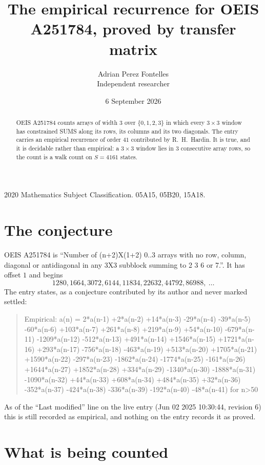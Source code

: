 \documentclass[11pt,a4paper]{article}
\title{The empirical recurrence for OEIS A251784, proved by transfer matrix}
\author{Adrian Perez Fontelles\\ \small Independent researcher}
\date{6 September 2026}
\theoremstyle{plain}
\theoremstyle{definition}
\begin{document}
\maketitle

\begin{abstract}
OEIS A251784 counts arrays of width $3$ over $\{0,1,2,3\}$ in which every $3\times3$ window has
constrained SUMS along its rows, its columns and its two diagonals. The entry carries an
empirical recurrence of order $41$ contributed by R.~H.~Hardin. It is true, and it is
decidable rather than empirical: a $3\times3$ window lies in $3$ consecutive array rows,
so the count is a walk count on $S=4161$ states.
\end{abstract}

\noindent\small 2020 Mathematics Subject Classification. 05A15, 05B20, 15A18.\normalsize

\section{The conjecture}

OEIS A251784 is ``Number of (n+2)X(1+2) 0..3 arrays with no row, column, diagonal or antidiagonal in any 3X3 subblock summing to 2 3 6 or 7.''. It has offset $1$ and begins
\[
1280, 1664, 3072, 6144, 11834, 22632, 44792, 86988,\ \dots
\]
The entry states, as a conjecture contributed by its author and never marked settled:
\begin{quote}
Empirical: a(n) = 2*a(n-1) +2*a(n-2) +14*a(n-3) -29*a(n-4) -39*a(n-5) -60*a(n-6) +103*a(n-7) +261*a(n-8) +219*a(n-9) +54*a(n-10) -679*a(n-11) -1209*a(n-12) -512*a(n-13) +491*a(n-14) +1546*a(n-15) +1721*a(n-16) +293*a(n-17) -756*a(n-18) -463*a(n-19) +513*a(n-20) +1705*a(n-21) +1590*a(n-22) -297*a(n-23) -1862*a(n-24) -1774*a(n-25) -161*a(n-26) +1644*a(n-27) +1852*a(n-28) +334*a(n-29) -1340*a(n-30) -1888*a(n-31) -1090*a(n-32) +44*a(n-33) +608*a(n-34) +484*a(n-35) +32*a(n-36) -352*a(n-37) -424*a(n-38) -336*a(n-39) -192*a(n-40) -48*a(n-41) for n>50
\end{quote}
As of the ``Last modified'' line on the live entry (Jun 02 2025 10:30:44, revision 6) this is still
recorded as empirical, and nothing on the entry records it as proved.

\section{What is being counted}
\end{document}
